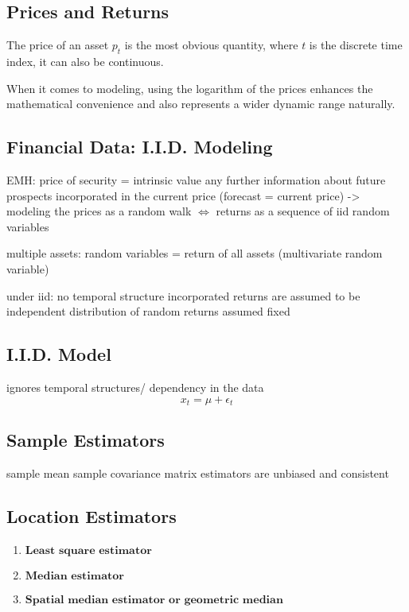
\newpage
\subsection{Prices and Returns}

The price of an asset $p_t$ is the most obvious quantity, where $t$ is the discrete time index, it can also be continuous.

When it comes to modeling, using the logarithm of the prices enhances the mathematical convenience and also represents a wider dynamic range naturally.



\subsection{Financial Data: I.I.D. Modeling}
EMH: price of security = intrinsic value
any further information about future prospects incorporated in the current price (forecast = current price) 
-> modeling the prices as a random walk $\iff$ returns as a sequence of iid random variables

multiple assets: random variables = return of all assets (multivariate random variable)

under iid: no temporal structure incorporated returns are assumed to be independent distribution of random returns assumed fixed
\subsection{I.I.D. Model}
ignores temporal structures/ dependency in the data
\[x_t = \mu + \epsilon_t\]
\subsection{Sample Estimators}
sample mean
sample covariance matrix
estimators are unbiased and consistent
\subsection{Location Estimators}
\begin{enumerate}
    \item $\textbf{Least square estimator}$
    \item $\textbf{Median estimator}$
    \item $\textbf{Spatial median estimator or geometric median}$
\end{enumerate}

